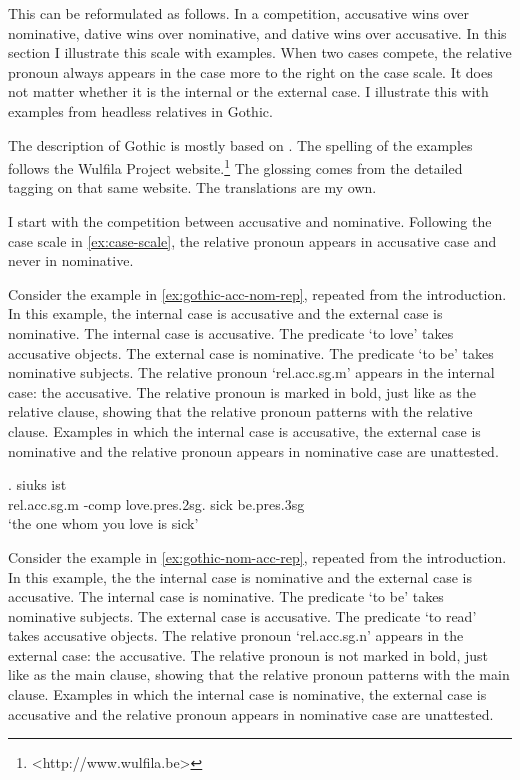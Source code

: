 This can be reformulated as follows. In a competition, accusative wins over nominative, dative wins over nominative, and dative wins over accusative. In this section I illustrate this scale with examples. When two cases compete, the relative pronoun always appears in the case more to the right on the case scale. It does not matter whether it is the internal or the external case. I illustrate this with examples from headless relatives in Gothic.

The description of Gothic is mostly based on \citep{harbert1978}. The spelling of the examples follows the Wulfila Project website.\footnote{
<http://www.wulfila.be>
} The glossing comes from the detailed tagging on that same website. The translations are my own.

I start with the competition between accusative and nominative. Following the case scale in \ref{ex:case-scale}, the relative pronoun appears in accusative case and never in nominative.

Consider the example in \ref{ex:gothic-acc-nom-rep}, repeated from the introduction. In this example, the internal case is accusative and the external case is nominative.
The internal case is accusative. The predicate  `to love' takes accusative objects.
The external case is nominative. The predicate  `to be' takes nominative subjects.
The relative pronoun  `\ac{rel}.\ac{acc}.\ac{sg}.\ac{m}' appears in the internal case: the accusative. The relative pronoun is marked in bold, just like as the relative clause, showing that the relative pronoun patterns with the relative clause.
Examples in which the internal case is accusative, the external case is nominative and the relative pronoun appears in nominative case are unattested.

\exg.    siuks ist\\
 \ac{rel}.\ac{acc}.\ac{sg}.\ac{m} -\ac{comp} love.\ac{pres}.2\ac{sg}.\scsub{[acc]} sick be.\ac{pres}.3\ac{sg}\scsub{[nom]}\\
 `the one whom you love is sick' \label{ex:gothic-acc-nom-rep}

Consider the example in \ref{ex:gothic-nom-acc-rep}, repeated from the introduction. In this example, the the internal case is nominative and the external case is accusative.
The internal case is nominative. The predicate  `to be' takes nominative subjects.
The external case is accusative. The predicate  `to read' takes accusative objects.
The relative pronoun  `\ac{rel}.\ac{acc}.\ac{sg}.\ac{n}' appears in the external case: the accusative. The relative pronoun is not marked in bold, just like as the main clause, showing that the relative pronoun patterns with the main clause.
Examples in which the internal case is nominative, the external case is accusative and the relative pronoun appears in nominative case are unattested.


